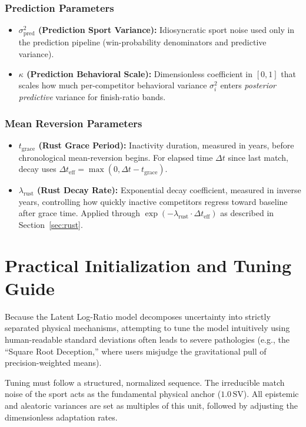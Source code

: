 \documentclass[12pt]{article}
\begin{document}
	\subsubsection*{Prediction Parameters}
	\begin{itemize}
		\item \textbf{$\sigma_{\mathrm{pred}}^2$ (Prediction Sport Variance):} Idiosyncratic sport noise used only in the prediction pipeline (win-probability denominators and predictive variance).
		\item \textbf{$\kappa$ (Prediction Behavioral Scale):} Dimensionless coefficient in $[0,1]$ that scales how much per-competitor behavioral variance $\sigma_i^2$ enters \emph{posterior predictive} variance for finish-ratio bands.
	\end{itemize}

	\subsubsection*{Mean Reversion Parameters}
	\begin{itemize}
		\item \textbf{$t_{\mathrm{grace}}$ (Rust Grace Period):} Inactivity duration, measured in years, before chronological mean-reversion begins. For elapsed time $\Delta t$ since last match, decay uses $\Delta t_{\mathrm{eff}} = \max(0, \Delta t - t_{\mathrm{grace}})$.
		\item \textbf{$\lambda_{\mathrm{rust}}$ (Rust Decay Rate):} Exponential decay coefficient, measured in inverse years, controlling how quickly inactive competitors regress toward baseline after grace time. Applied through $\exp(-\lambda_{\mathrm{rust}} \cdot \Delta t_{\mathrm{eff}})$ as described in Section~\ref{sec:rust}.
	\end{itemize}

	\section{Practical Initialization and Tuning Guide}
	\label{app:tuning}

	Because the Latent Log-Ratio model decomposes uncertainty into strictly separated physical mechanisms, attempting to tune the model intuitively using human-readable standard deviations often leads to severe pathologies (e.g., the ``Square Root Deception,'' where users misjudge the gravitational pull of precision-weighted means).

	Tuning must follow a structured, normalized sequence. The irreducible match noise of the sport acts as the fundamental physical anchor ($1.0\,\mathrm{SV}$). All epistemic and aleatoric variances are set as multiples of this unit, followed by adjusting the dimensionless adaptation rates.
\end{document}
